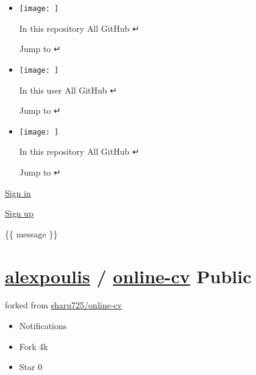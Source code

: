 \documentclass[english,]{article}
\providecommand{\tightlist}{%
  \setlength{\itemsep}{0pt}\setlength{\parskip}{0pt}}
\begin{document}
\begin{itemize}
\tightlist
\item
  \href{}{}

  \texttt{[image: ]}

  { In this repository } { All GitHub } {↵}

  Jump to {↵}
\item
  \href{}{}

  \texttt{[image: ]}

  { In this user } { All GitHub } {↵}

  Jump to {↵}
\item
  \href{}{}

  \texttt{[image: ]}

  { In this repository } { All GitHub } {↵}

  Jump to {↵}
\end{itemize}

\href{/login?return_to=https\%3A\%2F\%2Fgithub.com\%2Falexpoulis\%2Fonline-cv}{Sign
in}

\href{/signup?ref_cta=Sign+up\&ref_loc=header+logged+out\&ref_page=\%2F\%3Cuser-name\%3E\%2F\%3Crepo-name\%3E\&source=header-repo\&source_repo=alexpoulis\%2Fonline-cv}{Sign
up}

\hypertarget{start-of-content}{}

\hypertarget{js-flash-container}{}
\{\{ message \}\}

\hypertarget{js-repo-pjax-container}{}
\hypertarget{repository-container-header}{}
\hypertarget{alexpoulis-online-cv-public}{%
\section{\texorpdfstring{{ \href{/alexpoulis}{alexpoulis} } {/}
\textbf{\href{/alexpoulis/online-cv}{online-cv}}
{}{Public}}{ alexpoulis  / online-cv Public}}\label{alexpoulis-online-cv-public}}

{ forked from \href{/sharu725/online-cv}{sharu725/online-cv} }

\begin{itemize}
\item
  Notifications
\item
  Fork \protect\hypertarget{repo-network-counter}{}{4k}
\item
  { Star } \protect\hypertarget{repo-stars-counter-star}{}{0}
\end{itemize}
\end{document}
